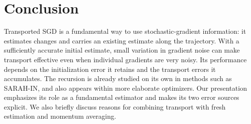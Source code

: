 \section{Conclusion}
\label{sec:conclusion}

Transported SGD is a fundamental way to use stochastic-gradient
information: it estimates changes and carries an existing estimate
along the trajectory. With a sufficiently accurate initial estimate,
small variation in gradient noise can make transport effective even
when individual gradients are very noisy. Its performance depends on
the initialization error it retains and the transport errors it
accumulates. The recursion is already studied on its own in methods
such as SARAH-IN, and also appears within more elaborate optimizers.
Our presentation emphasizes its role as a fundamental estimator and
makes its two error sources explicit. We also briefly discuss reasons
for combining transport with fresh estimation and momentum averaging.
